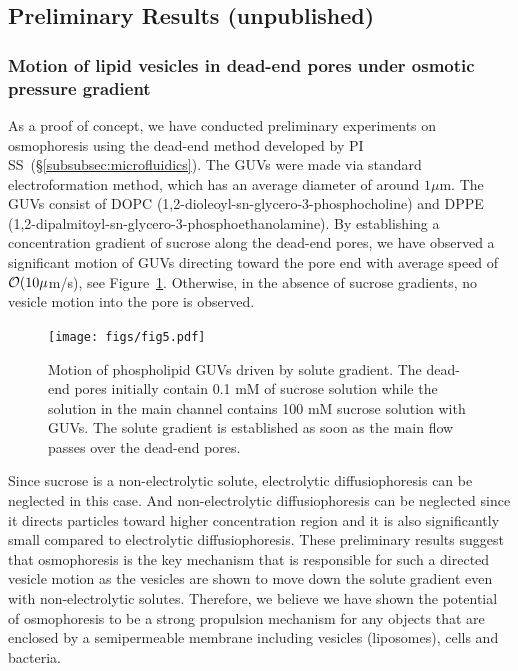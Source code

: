 \documentclass[11pt]{article}
\begin{document}
\subsection{Preliminary Results (unpublished)
\label{subsec:preliminary_results}}
\subsubsection{Motion of lipid vesicles in dead-end pores under osmotic
pressure gradient}
\label{subsubsec:osmophoresis_lipid_vesicles_deadend_pores}
As a proof of concept, we have conducted preliminary experiments on
osmophoresis using the dead-end method developed by PI
SS~(\S\ref{subsubsec:microfluidics}).  The GUVs were made via standard
electroformation method, which has an average diameter of around $1
\mu$m. The GUVs consist of DOPC
(1,2-dioleoyl-sn-glycero-3-phosphocholine) and DPPE
(1,2-dipalmitoyl-sn-glycero-3-phosphoethanolamine).  By establishing a
concentration gradient of sucrose along the dead-end pores, we have
observed a significant motion of GUVs directing toward the pore end with
average speed of ${\cal O}(10 \mu$m/s), see Figure~\ref{fig:fig5}.
Otherwise, in the absence of sucrose gradients, no vesicle motion into
the pore is observed.
%
\begin{figure}[h]
\begin{center}
\texttt{[image: figs/fig5.pdf]}
\caption{\label{fig:fig5} Motion of phospholipid GUVs driven by solute
  gradient. The dead-end pores initially contain 0.1 mM of sucrose
  solution while the solution in the main channel contains 100 mM
  sucrose solution with GUVs.  The solute gradient is established as
  soon as the main flow passes over the dead-end pores.}
\end{center}
\end{figure}
Since sucrose is a non-electrolytic solute, electrolytic
diffusiophoresis can be neglected in this case.  And non-electrolytic
diffusiophoresis can be neglected since it directs particles toward
higher concentration region and it is also significantly small compared
to electrolytic diffusiophoresis.  These preliminary results suggest
that osmophoresis is the key mechanism that is responsible for such a
directed vesicle motion as the vesicles are shown to move down the
solute gradient even with non-electrolytic solutes.  Therefore, we
believe we have shown the potential of osmophoresis to be a strong
propulsion mechanism for any objects that are enclosed by a
semipermeable membrane including vesicles (liposomes), cells and
bacteria.
\end{document}
